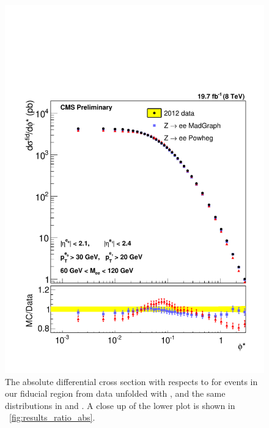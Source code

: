 \begin{figure}[!p]
    \centering
    \includegraphics[width=\textwidth]{figures/ZShape_elec_Abs_Dressed.pdf}
    \caption[
        The absolute differential cross section with respects to \phistar for
        \Ztoee events in our fiducial region from data unfolded with \MADGRAPH,
        and the same distributions in \MADGRAPH and \POWHEG.
    ]{
        The absolute differential cross section with respects to \phistar for
        \Ztoee events in our fiducial region from data unfolded with \MADGRAPH,
        and the same distributions in \MADGRAPH and \POWHEG. A close up of the
        lower plot is shown in \FIG~\ref{fig:results_ratio_abs}.
    }
    \label{fig:results_abs}
\end{figure}

